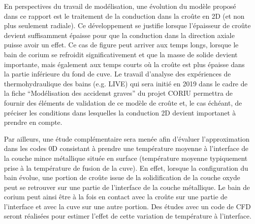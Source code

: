 En perspectives du travail de modélisation, une évolution du modèle proposé dans ce rapport est le traitement de la conduction dans la croûte en 2D (et non plus seulement radiale). Ce développement se justifie lorsque l'épaisseur de croûte devient suffisamment épaisse pour que la conduction dans la direction axiale puisse avoir un effet. Ce cas de figure peut arriver aux temps longs, lorsque le bain de corium se refroidit significativement et que la masse de solide devient importante, mais également aux temps courts où la croûte est plus épaisse dans la partie inférieure du fond de cuve. Le travail d'analyse des expériences de thermohydraulique des bains (e.g. LIVE) qui sera initié en 2019 dans le cadre de la fiche ``Modélisation des accidenst graves'' du projet CORIU permettra de fournir des éléments de validation de ce modèle de croûte et, le cas échéant, de préciser les conditions dans lesquelles la conduction 2D devient importanet à prendre en compte.

Par ailleurs, une étude complémentaire sera menée afin d'évaluer l'approximation dans les codes 0D consistant à prendre une température moyenne à l'interface de la couche mince métallique située en surface (température moyenne typiquement prise à la température de fusion de la cuve). En effet, lorsque la configuration du bain évolue, une portion de croûte issue de la solidification de la couche oxyde peut se retrouver sur une partie de l'interface de la couche métallique. Le bain de corium peut ainsi être à la fois en contact avec la croûte sur une partie de l'interface et avec la cuve sur une autre portion. Des études avec un code de CFD seront réalisées pour estimer l'effet de cette variation de température à l'interface.
